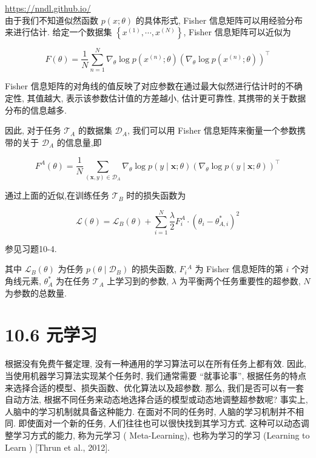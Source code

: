 \documentclass[10pt]{article}
\begin{document}
\href{https://nndl.github.io/}{https://nndl.github.io/}\\
由于我们不知道似然函数 $p(x ; \theta)$ 的具体形式, Fisher 信息矩阵可以用经验分布来进行估计. 给定一个数据集 $\left\{x^{(1)}, \cdots, x^{(N)}\right\}$, Fisher 信息矩阵可以近似为


\begin{equation*}
F(\theta)=\frac{1}{N} \sum_{n=1}^{N} \nabla_{\theta} \log p\left(x^{(n)} ; \theta\right)\left(\nabla_{\theta} \log p\left(x^{(n)} ; \theta\right)\right)^{\top} \tag{10.48}
\end{equation*}


Fisher 信息矩阵的对角线的值反映了对应参数在通过最大似然进行估计时的不确定性, 其值越大, 表示该参数估计值的方差越小, 估计更可靠性, 其携带的关于数据分布的信息越多.

因此, 对于任务 $\mathcal{T}_{A}$ 的数据集 $\mathcal{D}_{A}$, 我们可以用 Fisher 信息矩阵来衡量一个参数携带的关于 $\mathcal{D}_{A}$ 的信息量,即


\begin{equation*}
F^{A}(\theta)=\frac{1}{N} \sum_{(\boldsymbol{x}, y) \in \mathcal{D}_{A}} \nabla_{\theta} \log p(y \mid \boldsymbol{x} ; \theta)\left(\nabla_{\theta} \log p(y \mid \boldsymbol{x} ; \theta)\right)^{\top} \tag{10.49}
\end{equation*}


通过上面的近似,在训练任务 $\mathcal{T}_{B}$ 时的损失函数为


\begin{equation*}
\mathcal{L}(\theta)=\mathcal{L}_{B}(\theta)+\sum_{i=1}^{N} \frac{\lambda}{2} F_{i}^{A} \cdot\left(\theta_{i}-\theta_{A, i}^{*}\right)^{2} \tag{10.50}
\end{equation*}


参见习题10-4.

其中 $\mathcal{L}_{B}(\theta)$ 为任务 $p\left(\theta \mid \mathcal{D}_{B}\right)$ 的损失函数, $F_{i}{ }^{A}$ 为 Fisher 信息矩阵的第 $i$ 个对角线元素, $\theta_{A}^{*}$ 为在任务 $\mathcal{T}_{A}$ 上学习到的参数, $\lambda$ 为平衡两个任务重要性的超参数, $N$ 为参数的总数量.

\section*{10.6 元学习}
根据没有免费午餐定理, 没有一种通用的学习算法可以在所有任务上都有效. 因此, 当使用机器学习算法实现某个任务时, 我们通常需要 “就事论事”, 根据任务的特点来选择合适的模型、损失函数、优化算法以及超参数. 那么, 我们是否可以有一套自动方法, 根据不同任务来动态地选择合适的模型或动态地调整超参数呢? 事实上, 人脑中的学习机制就具备这种能力. 在面对不同的任务时, 人脑的学习机制并不相同. 即使面对一个新的任务, 人们往往也可以很快找到其学习方式. 这种可以动态调整学习方式的能力, 称为元学习 ( Meta-Learning), 也称为学习的学习 (Learning to Learn ) [Thrun et al., 2012].
\end{document}
